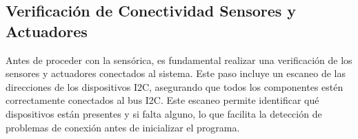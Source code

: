 \subsection{Verificación de Conectividad Sensores y Actuadores }
Antes de proceder con la sensórica, es fundamental realizar una verificación de los sensores y actuadores conectados al sistema. Este paso incluye un escaneo de las direcciones de los dispositivos I2C, asegurando que todos los componentes estén correctamente conectados al bus I2C. Este escaneo permite identificar qué dispositivos están presentes y si falta alguno, lo que facilita la detección de problemas de conexión antes de inicializar el programa.\\ \\

